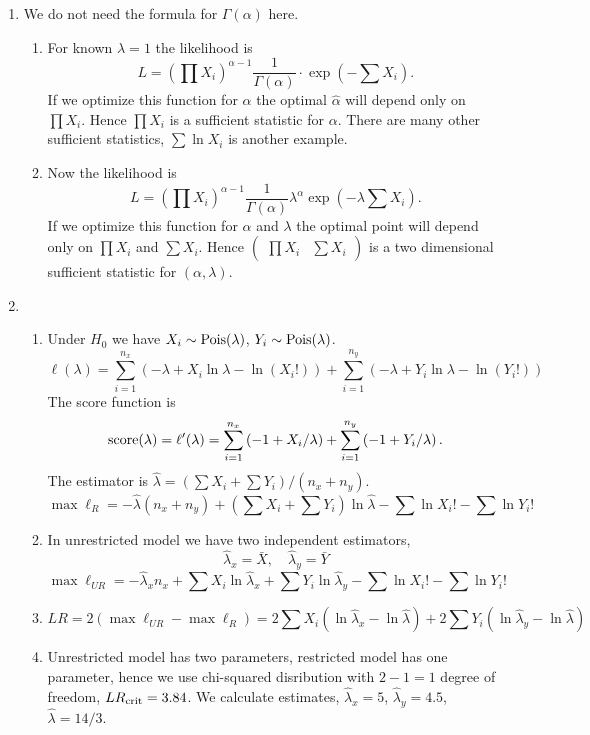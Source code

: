 \begin{enumerate}
\item We do not need the formula for $\Gamma(\alpha)$ here. 
\begin{enumerate}
    \item For known $\lambda = 1$ the likelihood is 
    \[
    L = \left(\prod X_i \right)^{\alpha - 1} \frac{1}{\Gamma(\alpha)} \cdot \exp( - \sum X_i).
    \]
    If we optimize this function for $\alpha$ the optimal $\hat\alpha$ will depend only on $\prod X_i$.
    Hence $\prod X_i$ is a sufficient statistic for $\alpha$. 
    There are many other sufficient statistics, $\sum \ln X_i$ is another example. 
    \item Now the likelihood is 
    \[
    L = \left(\prod X_i \right)^{\alpha - 1} \frac{1}{\Gamma(\alpha)} \lambda^{\alpha }\exp( - \lambda \sum X_i).
    \]
    If we optimize this function for $\alpha$ and $\lambda$ the optimal point will depend only on $\prod X_i$ and $\sum X_i$.
    Hence $\begin{pmatrix}
        \prod X_i & \sum X_i 
    \end{pmatrix}$ is a two dimensional sufficient statistic for $(\alpha, \lambda)$.
    
\end{enumerate}

\item 
\begin{enumerate}
    \item Under $H_0$ we have $X_i \sim \mathrm{Pois}(\lambda)$, $Y_i \sim \mathrm{Pois}(\lambda)$.
    \[
        \ell(\lambda) = \sum_{i=1}^{n_x} \left( -\lambda + X_i \ln \lambda - \ln (X_i!)\right) + 
        \sum_{i=1}^{n_y} \left( -\lambda + Y_i \ln \lambda - \ln (Y_i!)\right)       
    \]
    The score function is 
    \[
    \mathrm{score}(\lambda) = \ell'(\lambda) = \sum_{i=1}^{n_x} \left( -1 + X_i / \lambda\right) + \sum_{i=1}^{n_y} \left( -1 + Y_i / \lambda\right).
    \]
    The estimator is $\hat \lambda = (\sum X_i + \sum Y_i) / (n_x + n_y)$.
    \[
    \max \ell_R = - \hat \lambda (n_x + n_y) + \left(\sum X_i + \sum Y_i \right)\ln \hat\lambda - \sum \ln X_i! - \sum \ln Y_i!    
    \]
    
    \item In unrestricted model we have two independent estimators, 
    \[
    \hat \lambda_x = \bar X, \quad \hat \lambda_y = \bar Y    
    \]
    \[
    \max \ell_{UR} = - \hat \lambda_x n_x + \sum X_i \ln \hat\lambda_x + \sum Y_i \ln \hat\lambda_y - \sum \ln X_i! - \sum \ln Y_i!    
    \]

    \item 
    \[
    LR = 2(\max \ell_{UR} - \max \ell_R) = 2 \sum X_i (\ln \hat \lambda_x - \ln \hat\lambda) + 2 \sum Y_i (\ln \hat \lambda_y - \ln \hat\lambda)
    \]
    \item Unrestricted model has two parameters, restricted model has one parameter, 
    hence we use chi-squared disribution with $2 - 1 = 1$ degree of freedom, $LR_{\mathrm{crit}} = 3.84$.
    We calculate estimates, $\hat \lambda_x = 5$, $\hat\lambda_y = 4.5$, $\hat\lambda = 14/3$.
    

\end{enumerate}
\end{enumerate}
